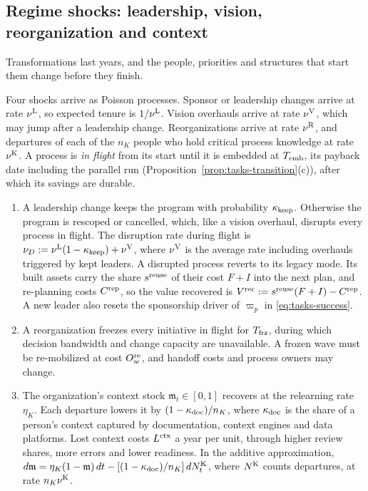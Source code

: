 \subsection{Regime shocks: leadership, vision, reorganization and context}\label{sec:ext-shocks}

Transformations last years, and the people, priorities and structures that start them change before they finish.

\begin{assumption}\label{ass:ext-shocks}
Four shocks arrive as Poisson processes. Sponsor or leadership changes arrive at rate $\nu^{\rm L}$, so expected tenure is $1/\nu^{\rm L}$. Vision overhauls arrive at rate $\nu^{\rm V}$, which may jump after a leadership change. Reorganizations arrive at rate $\nu^{\rm R}$, and departures of each of the $n_K$ people who hold critical process knowledge at rate $\nu^{\rm K}$. A process is \emph{in flight} from its start until it is embedded at $T_{\rm emb}$, its payback date including the parallel run (Proposition~\ref{prop:tasks-transition}(c)), after which its savings are durable.
\begin{enumerate}
\item[(i)] A leadership change keeps the program with probability $\kappa_{\rm keep}$. Otherwise the program is rescoped or cancelled, which, like a vision overhaul, disrupts every process in flight. The disruption rate during flight is $\nu_D:=\nu^{\rm L}(1-\kappa_{\rm keep})+\nu^{\rm V}$, where $\nu^{\rm V}$ is the average rate including overhauls triggered by kept leaders. A disrupted process reverts to its legacy mode. Its built assets carry the share $s^{\rm reuse}$ of their cost $F+I$ into the next plan, and re-planning costs $C^{\rm rep}$, so the value recovered is $V^{\rm rec}:=s^{\rm reuse}(F+I)-C^{\rm rep}$. A new leader also resets the sponsorship driver of $\varpi_p$ in \eqref{eq:tasks-success}.
\item[(ii)] A reorganization freezes every initiative in flight for $T_{\rm frz}$, during which decision bandwidth and change capacity are unavailable. A frozen wave must be re-mobilized at cost $O^{\rm re}_w$, and handoff costs and process owners may change.
\item[(iii)] The organization's context stock $\mathfrak m_t\in[0,1]$ recovers at the relearning rate $\eta_K$. Each departure lowers it by $(1-\kappa_{\rm doc})/n_K$, where $\kappa_{\rm doc}$ is the share of a person's context captured by documentation, context engines and data platforms. Lost context costs $L^{\rm ctx}$ a year per unit, through higher review shares, more errors and lower readiness. In the additive approximation, $d\mathfrak m=\eta_K(1-\mathfrak m)\,dt-[(1-\kappa_{\rm doc})/n_K]\,dN^{\rm K}_t$, where $N^{\rm K}$ counts departures, at rate $n_K\nu^{\rm K}$.
\end{enumerate}
\end{assumption}

